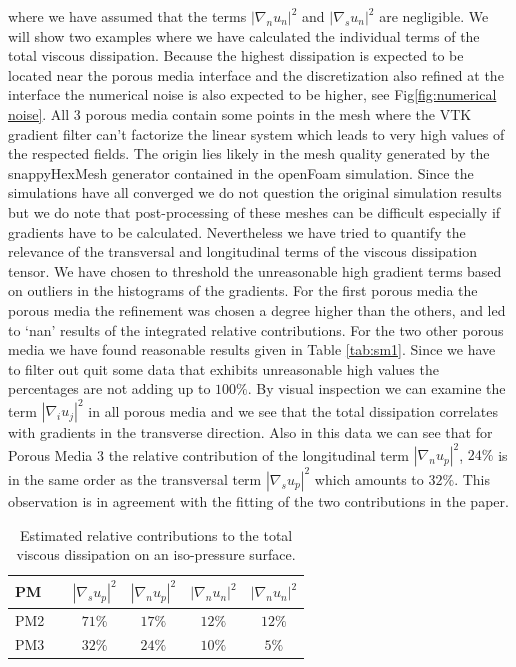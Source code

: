 \documentclass[draft,jgrga]{agutexSI2019}
\begin{document}
\begin{article}
where we have assumed that the terms $ \left|\nabla_n u_n\right|^2$ and $ \left|\nabla_s u_n\right|^2$ are negligible. We will show two examples where we have calculated the individual terms of the total viscous dissipation. Because the highest dissipation is expected to be located near the porous media interface and the discretization also refined at the interface the numerical noise is also expected to be higher, see Fig\ref{fig:numerical noise}. All 3 porous media contain some points in the mesh where the VTK gradient filter can't factorize the linear system which leads to very high values of the respected fields. The origin lies likely in the mesh quality generated by the snappyHexMesh generator contained in the openFoam simulation. Since the simulations have all converged we do not question the original simulation results but we do note that post-processing of these meshes can be difficult especially if gradients have to be calculated. Nevertheless we have tried to quantify the relevance of the transversal and longitudinal terms of the viscous dissipation tensor. We have chosen to threshold the unreasonable high gradient terms based on outliers in the histograms of the gradients. For the first porous media the porous media the refinement was chosen a degree higher than the others, and led to `nan' results of the integrated relative contributions. For the two other porous media we have found reasonable results given in Table \ref{tab:sm1}. Since we have to filter out quit some data that exhibits unreasonable high values the percentages are not adding up to $100\%$. By visual inspection we can examine the term $\left|\nabla_i u_j\right|^2$ in all porous media and we see that the total dissipation correlates with gradients in the transverse direction. Also in this data we can see that for Porous Media 3 the relative contribution of the longitudinal term $ \left|\nabla_n u_p\right|^2$, $24\%$ is in the same order as the transversal term $ \left|\nabla_s u_p\right|^2$ which amounts to $32\%$. This observation is in agreement with the fitting of the two contributions in the paper.


\end{article}

\begin{table}[htbp!]\label{tab:sm1}
\centering
\begin{tabular}{l|c|c|c|c|c}
PM & & $\left|\nabla_s u_p\right|^2$ & $ \left|\nabla_n u_p\right|^2$ & $\left|\nabla_n u_n\right|^2$ & $\left|\nabla_n u_n\right|^2$ \\
\hline
PM2 &  & $71 \%$ & $17\%$ & $12\%$ & $12\%$ \\
PM3 &  & $32 \%$ & $24\%$ & $10\%$ & $5\%$ \\
\end{tabular}
\caption{\label{tab:table-name}Estimated relative contributions to the total viscous dissipation on an iso-pressure surface. }
\end{table}
\end{document}
